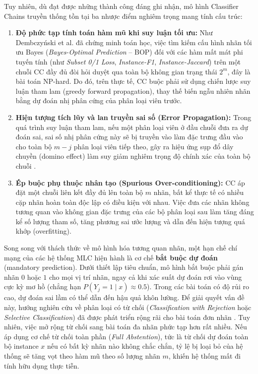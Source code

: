 \documentclass[11pt,a4paper]{article}
\begin{document}
Tuy nhiên, dù đạt được những thành công đáng ghi nhận, mô hình Classifier Chains truyền thống tồn tại ba nhược điểm nghiêm trọng mang tính cấu trúc:
\begin{enumerate}
    \item \textbf{Độ phức tạp tính toán hàm mũ khi suy luận tối ưu:} Như Dembczy\'nski et al. \cite{dembczynski2010bayes, dembczynski2012bayes} đã chứng minh toán học, việc tìm kiếm cấu hình nhãn tối ưu Bayes (\textit{Bayes-Optimal Prediction} -- BOP) đối với các hàm mất mát phi tuyến tính (như \textit{Subset 0/1 Loss}, \textit{Instance-F1}, \textit{Instance-Jaccard}) trên một chuỗi CC đầy đủ đòi hỏi duyệt qua toàn bộ không gian trạng thái $2^m$, đây là bài toán NP-hard. Do đó, trên thực tế, CC buộc phải sử dụng chiến lược suy luận tham lam (greedy forward propagation), thay thế biến ngẫu nhiên nhãn bằng dự đoán nhị phân cứng của phân loại viên trước.
    \item \textbf{Hiện tượng tích lũy và lan truyền sai số (Error Propagation):} Trong quá trình suy luận tham lam, nếu một phân loại viên ở đầu chuỗi đưa ra dự đoán sai, sai số nhị phân cứng này sẽ bị truyền vào làm đặc trưng đầu vào cho toàn bộ $m - j$ phân loại viên tiếp theo, gây ra hiệu ứng sụp đổ dây chuyền (domino effect) làm suy giảm nghiêm trọng độ chính xác của toàn bộ chuỗi \cite{senge2014reliable}.
    \item \textbf{Ép buộc phụ thuộc nhân tạo (Spurious Over-conditioning):} CC áp đặt một chuỗi liên kết đầy đủ lên toàn bộ $m$ nhãn, bất kể thực tế có nhiều cặp nhãn hoàn toàn độc lập có điều kiện với nhau. Việc đưa các nhãn không tương quan vào không gian đặc trưng của các bộ phân loại sau làm tăng đáng kể số lượng tham số, tăng phương sai ước lượng và dẫn đến hiện tượng quá khớp (overfitting).
\end{enumerate}

Song song với thách thức về mô hình hóa tương quan nhãn, một hạn chế chí mạng của các hệ thống MLC hiện hành là cơ chế \textbf{bắt buộc dự đoán} (mandatory prediction). Dưới thiết lập tiêu chuẩn, mô hình bắt buộc phải gán nhãn $0$ hoặc $1$ cho mọi vị trí nhãn, ngay cả khi xác suất dự đoán rơi vào vùng cực kỳ mơ hồ (chẳng hạn $P(Y_j = 1 \mid x) \approx 0.5$). Trong các bài toán có độ rủi ro cao, dự đoán sai lầm có thể dẫn đến hậu quả khôn lường. Để giải quyết vấn đề này, hướng nghiên cứu về phân loại có từ chối (\textit{Classification with Rejection} hoặc \textit{Selective Classification}) đã được phát triển rộng rãi cho bài toán đơn nhãn \cite{chow1970optimum, geifman2017selective}. Tuy nhiên, việc mở rộng từ chối sang bài toán đa nhãn phức tạp hơn rất nhiều. Nếu áp dụng cơ chế từ chối toàn phần (\textit{Full Abstention}), tức là từ chối dự đoán toàn bộ instance $x$ nếu có bất kỳ nhãn nào không chắc chắn, tỷ lệ bị loại bỏ của hệ thống sẽ tăng vọt theo hàm mũ theo số lượng nhãn $m$, khiến hệ thống mất đi tính hữu dụng thực tiễn.
\end{document}
